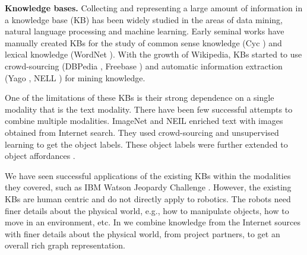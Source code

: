 \noindent
\textbf{Knowledge bases.}
Collecting and representing a large amount of information in a knowledge base (KB) has been widely studied in the
areas of data mining, natural language processing and machine learning. Early seminal works have manually created KBs for the study of common sense knowledge (Cyc \cite{cyc1995}) and lexical knowledge (WordNet \cite{wordnet1998}). With the growth of Wikipedia, KBs started to use crowd-sourcing (DBPedia \cite{dbpedia2007}, Freebase \cite{freebase2008}) and automatic information extraction (Yago \cite{yago2007,yago22013}, NELL \cite{nell2010}) for mining knowledge.

One of the limitations of these KBs is their strong dependence on a single modality that is the text modality. There have been few successful attempts to combine multiple modalities. ImageNet \cite{imagenet2009} and NEIL \cite{chen_iccv13} enriched text with images obtained from Internet search. They used crowd-sourcing and unsupervised learning to get the object labels. These object labels were further extended to object affordances \cite{zhu2014}.

We have seen successful applications of the existing KBs within the modalities they covered, such as IBM Watson Jeopardy Challenge \cite{ferrucci2012a}. However, the existing KBs are human centric and do not directly apply to robotics. The robots need finer details about the physical world, e.g., how to manipulate objects, how to move in an environment, etc. In \robobrain{} we combine knowledge from the Internet sources with finer details about the physical world, from \robobrain{} project partners, to get an overall rich graph representation.